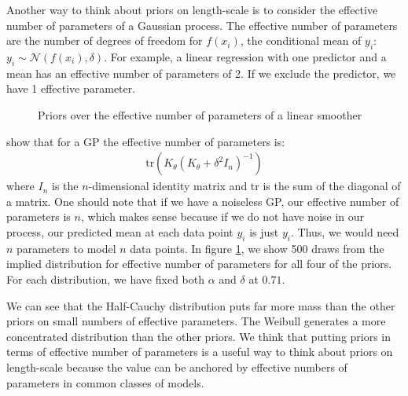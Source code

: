 \documentclass{article}
\begin{document}
Another way to think about priors on length-scale is to consider the effective
number of parameters of a Gaussian process. The effective number of parameters
are the number of degrees of freedom for $f(x_i)$, the conditional mean of $y_i$:
$y_i \sim \mathcal{N}(f(x_i), \delta)$.
For example, a linear regression with one predictor and a mean has an effective
number of parameters of 2. If we exclude the predictor, we have 1 effective
parameter.
\begin{figure}[t] 
  \caption{Priors over the effective number of parameters of a linear smoother} \label{eff_pars_plot}
\end{figure}
\citet{rasmussen2005gaussian} show that for a GP the effective number of
parameters is:
\begin{align*}
  \text{tr}(K_\theta (K_\theta + \delta^2 I_n)^{-1})
\end{align*}
where $I_n$ is the $n$-dimensional identity matrix and tr is the sum of the
diagonal of a matrix. One should note that if we have a noiseless GP, our
effective number of parameters is $n$, which makes sense because if we do not
have noise in our process, our predicted mean at each data point $y_i$ is just
$y_i$. Thus, we would need $n$ parameters to model $n$ data points. In figure
\ref{eff_pars_plot}, we show 500 draws from the implied distribution for
effective number of parameters for all four of the priors. For each
distribution, we have fixed both $\alpha$ and $\delta$ at $0.71$. 

We can see that the Half-Cauchy distribution puts far more mass than the other
priors on small numbers of effective parameters. The Weibull generates a
more concentrated distribution than the other priors. We think that putting
priors in terms of effective number of parameters is a useful way to think
about priors on length-scale because the value can be anchored by effective
numbers of parameters in common classes of models.
\end{document}
